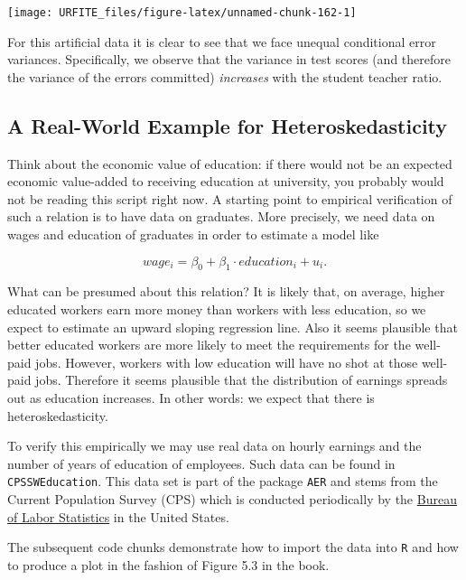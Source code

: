 \documentclass[]{book}
\theoremstyle{definition}
\theoremstyle{definition}
\theoremstyle{definition}
\theoremstyle{remark}
\begin{document}
\begin{center}\texttt{[image: URFITE\_files/figure-latex/unnamed-chunk-162-1]} \end{center}

For this artificial data it is clear to see that we face unequal
conditional error variances. Specifically, we observe that the variance
in test scores (and therefore the variance of the errors committed)
\emph{increases} with the student teacher ratio.

\subsection*{A Real-World Example for
Heteroskedasticity}\label{a-real-world-example-for-heteroskedasticity}

Think about the economic value of education: if there would not be an
expected economic value-added to receiving education at university, you
probably would not be reading this script right now. A starting point to
empirical verification of such a relation is to have data on graduates.
More precisely, we need data on wages and education of graduates in
order to estimate a model like

\[ wage_i = \beta_0 + \beta_1 \cdot education_i + u_i. \]

What can be presumed about this relation? It is likely that, on average,
higher educated workers earn more money than workers with less
education, so we expect to estimate an upward sloping regression line.
Also it seems plausible that better educated workers are more likely to
meet the requirements for the well-paid jobs. However, workers with low
education will have no shot at those well-paid jobs. Therefore it seems
plausible that the distribution of earnings spreads out as education
increases. In other words: we expect that there is heteroskedasticity.

To verify this empirically we may use real data on hourly earnings and
the number of years of education of employees. Such data can be found in
\texttt{CPSSWEducation}. This data set is part of the package
\texttt{AER} and stems from the Current Population Survey (CPS) which is
conducted periodically by the \href{http://www.bls.gov/}{Bureau of Labor
Statistics} in the United States.

The subsequent code chunks demonstrate how to import the data into
\texttt{R} and how to produce a plot in the fashion of Figure 5.3 in the
book.
\end{document}
